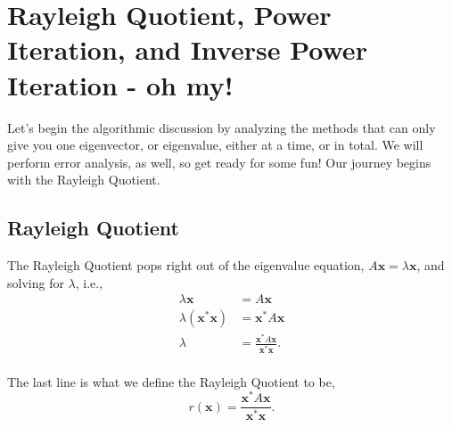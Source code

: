 \documentclass[paper=a4, fontsize=11pt]{scrartcl} %
\numberwithin{equation}{section} %
\numberwithin{figure}{section} %
\numberwithin{table}{section} %
\begin{document}
%
%

\section{Rayleigh Quotient, Power Iteration, and Inverse Power Iteration - oh my!}

Let's begin the algorithmic discussion by analyzing the methods that can only give you one eigenvector, or eigenvalue, either at a time, or in total. We will perform error analysis, as well, so get ready for some fun! Our journey begins with the Rayleigh Quotient.

%
%
\subsection{Rayleigh Quotient}

The Rayleigh Quotient pops right out of the eigenvalue equation, $A\textbf{x} = \lambda \textbf{x}$, and solving for $\lambda$, i.e., 
\begin{align*}
\lambda \textbf{x} &= A\textbf{x} \\ 
\lambda (\textbf{x}^{*} \textbf{x}) &= \textbf{x}^{*} A\textbf{x} \\ 
\lambda &= \frac{  \textbf{x}^{*} A\textbf{x}       }{  \textbf{x}^{*}\textbf{x}       }. \\
\end{align*}

The last line is what we define the Rayleigh Quotient to be, 
\begin{equation}
\label{rayleigh_quotient} r(\textbf{x}) =  \frac{  \textbf{x}^{*} A\textbf{x}       }{  \textbf{x}^{*}\textbf{x}  }.
\end{equation}
\end{document}

